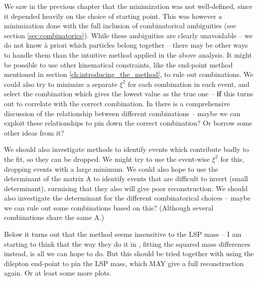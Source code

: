 \documentclass[twoside,english]{uiofysmaster}
\begin{document}
We saw in the previous chapter that the minimization was not well-defined, since it depended heavily on the choice of starting point. This was however a minimization done with the full inclusion of combinatorical ambiguities (see section \ref{sec:combinatorics}). While these ambiguities are clearly unavoidable -- we do not know \`{a} priori which particles belong together -- there may be other ways to handle them than the intuitive method applied in the above analysis. It might be possible to use other kinematical constraints, like the end-point method mentioned in section \ref{ch:introducing_the_method}, to rule out combinations. We could also try to minimize a separate $\xi^2$ for each combination in each event, and select the combination which gives the lowest value as the true one -- {\bf if} this turns out to correlate with the correct combination. In \cite{Gripaios:2011jm} there is a comprehensive discussion of the relationship between different combinations -- maybe we can exploit these relationships to pin down the correct combination? Or borrow some other ideas from it?

We should also investigate methods to identify events which contribute badly to the fit, so they can be dropped. We might try to use the event-wise $\xi^2$ for this, dropping events with a large minimum. We could also hope to use the determinant of the matrix A to identify events that are difficult to invert (small determinant), surmising that they also will give poor reconstruction. We should also investigate the determinant for the different combinatorical choices -- maybe we can rule out some combinations based on this? (Although several combinations share the same A.)

Below it turns out that the method seems insensitive to the LSP mass -- I am starting to think that the way they do it in \cite{Nojiri:2010dk}, fitting the squared mass differences instead, is all we can hope to do. But this should be tried together with using the dilepton end-point to pin the LSP mass, which MAY give a full reconstruction again. Or at least some more plots.
\end{document}
